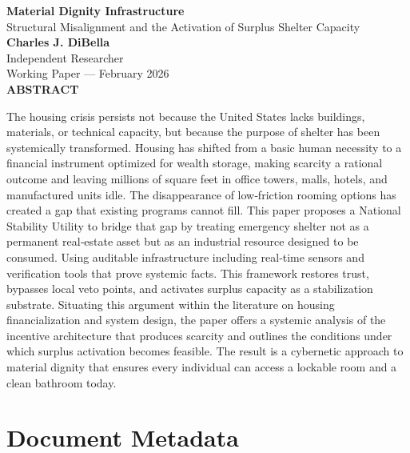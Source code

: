 \documentclass[12pt, letterpaper]{article}
\begin{document}
\begin{titlepage}
\begin{center}
{\LARGE \textbf{Material Dignity Infrastructure}}\\[6pt]
{\large Structural Misalignment and the Activation of Surplus Shelter Capacity}\\[1.0cm]
{\normalsize \textbf{Charles J. DiBella}}\\[0.01cm]
{\normalsize Independent Researcher}\\[0.01cm]
{\normalsize Working Paper --- February 2026}\\[0.5cm]
\textbf{ABSTRACT}
\vspace{0.5cm}
\end{center}
\begin{minipage}{0.95\textwidth}
\noindent

The housing crisis persists not because the United States lacks buildings, materials, or technical capacity, but because the purpose of shelter has been systemically transformed. Housing has shifted from a basic human necessity to a financial instrument optimized for wealth storage, making scarcity a rational outcome and leaving millions of square feet in office towers, malls, hotels, and manufactured units idle. The disappearance of low‑friction rooming options has created a gap that existing programs cannot fill. This paper proposes a National Stability Utility to bridge that gap by treating emergency shelter not as a permanent real‑estate asset but as an industrial resource designed to be consumed. Using auditable infrastructure including real‑time sensors and verification tools that prove systemic facts. This framework restores trust, bypasses local veto points, and activates surplus capacity as a stabilization substrate. Situating this argument within the literature on housing financialization and system design, the paper offers a systemic analysis of the incentive architecture that produces scarcity and outlines the conditions under which surplus activation becomes feasible. The result is a cybernetic approach to material dignity that ensures every individual can access a lockable room and a clean bathroom today.

\end{minipage}
\end{titlepage}


\newpage

\section*{Document Metadata}
\end{document}
